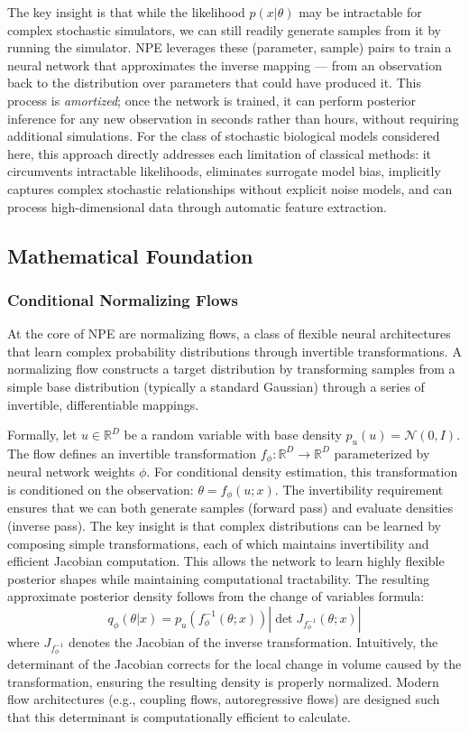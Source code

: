 \documentclass{article}
\begin{document}
The key insight is that while the likelihood $p(x|\theta)$ may be intractable for complex stochastic simulators, we can still readily generate samples from it by running the simulator. NPE leverages these (parameter, sample) pairs to train a neural network that approximates the inverse mapping — from an observation back to the distribution over parameters that could have produced it. This process is \textit{amortized}; once the network is trained, it can perform posterior inference for any new observation in seconds rather than hours, without requiring additional simulations. For the class of stochastic biological models considered here, this approach directly addresses each limitation of classical methods: it circumvents intractable likelihoods, eliminates surrogate model bias, implicitly captures complex stochastic relationships without explicit noise models, and can process high-dimensional data through automatic feature extraction.

\subsection{Mathematical Foundation}

\subsubsection{Conditional Normalizing Flows}

At the core of NPE are normalizing flows, a class of flexible neural architectures that learn complex probability distributions through invertible transformations. A normalizing flow constructs a target distribution by transforming samples from a simple base distribution (typically a standard Gaussian) through a series of invertible, differentiable mappings.

Formally, let $u \in \mathbb{R}^D$ be a random variable with base density $p_u(u) = \mathcal{N}(0, I)$. The flow defines an invertible transformation $f_\phi: \mathbb{R}^D \rightarrow \mathbb{R}^D$ parameterized by neural network weights $\phi$. For conditional density estimation, this transformation is conditioned on the observation: $\theta = f_\phi(u; x)$. The invertibility requirement ensures that we can both generate samples (forward pass) and evaluate densities (inverse pass). The key insight is that complex distributions can be learned by composing simple transformations, each of which maintains invertibility and efficient Jacobian computation. This allows the network to learn highly flexible posterior shapes while maintaining computational tractability. The resulting approximate posterior density follows from the change of variables formula:
\begin{equation}
	q_\phi(\theta | x) = p_u(f_\phi^{-1}(\theta; x)) \left| \det J_{f_\phi^{-1}}(\theta; x) \right|
\end{equation}
where $J_{f_\phi^{-1}}$ denotes the Jacobian of the inverse transformation. Intuitively, the determinant of the Jacobian corrects for the local change in volume caused by the transformation, ensuring the resulting density is properly normalized. Modern flow architectures (e.g., coupling flows, autoregressive flows) are designed such that this determinant is computationally efficient to calculate.
\end{document}

